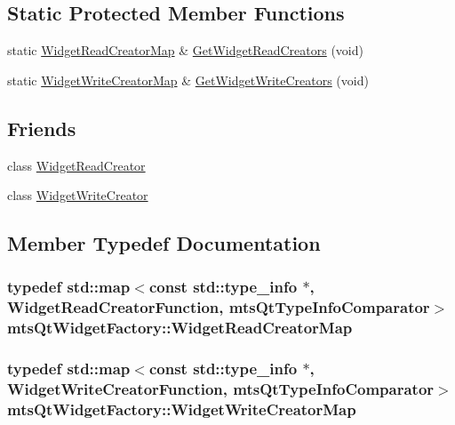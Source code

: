 \subsection*{Static Protected Member Functions}
\begin{DoxyCompactItemize}
\item 
static \hyperlink{classmts_qt_widget_factory_a22c882dba48529d554a71443765cb645}{Widget\-Read\-Creator\-Map} \& \hyperlink{classmts_qt_widget_factory_ae1c4cd68242b6b184762d4c2e233edfc}{Get\-Widget\-Read\-Creators} (void)
\item 
static \hyperlink{classmts_qt_widget_factory_aa2d044bd78383f0beb1973cbb076d4df}{Widget\-Write\-Creator\-Map} \& \hyperlink{classmts_qt_widget_factory_a7cd290938deff1f5471a9bb2640d22f1}{Get\-Widget\-Write\-Creators} (void)
\end{DoxyCompactItemize}
\subsection*{Friends}
\begin{DoxyCompactItemize}
\item 
class \hyperlink{classmts_qt_widget_factory_ad9d711027580a58bc57b4a3f6579be13}{Widget\-Read\-Creator}
\item 
class \hyperlink{classmts_qt_widget_factory_a19ec73574902b95864ee67c18b960512}{Widget\-Write\-Creator}
\end{DoxyCompactItemize}


\subsection{Member Typedef Documentation}
\hypertarget{classmts_qt_widget_factory_a22c882dba48529d554a71443765cb645}{
\subsubsection[{Widget\-Read\-Creator\-Map}]{\setlength{\rightskip}{0pt plus 5cm}typedef std\-::map$<$const std\-::type\-\_\-info $\ast$, Widget\-Read\-Creator\-Function, {\bf mts\-Qt\-Type\-Info\-Comparator}$>$ {\bf mts\-Qt\-Widget\-Factory\-::\-Widget\-Read\-Creator\-Map}}}\label{classmts_qt_widget_factory_a22c882dba48529d554a71443765cb645}
\hypertarget{classmts_qt_widget_factory_aa2d044bd78383f0beb1973cbb076d4df}{
\subsubsection[{Widget\-Write\-Creator\-Map}]{\setlength{\rightskip}{0pt plus 5cm}typedef std\-::map$<$const std\-::type\-\_\-info $\ast$, Widget\-Write\-Creator\-Function, {\bf mts\-Qt\-Type\-Info\-Comparator}$>$ {\bf mts\-Qt\-Widget\-Factory\-::\-Widget\-Write\-Creator\-Map}}}\label{classmts_qt_widget_factory_aa2d044bd78383f0beb1973cbb076d4df}


